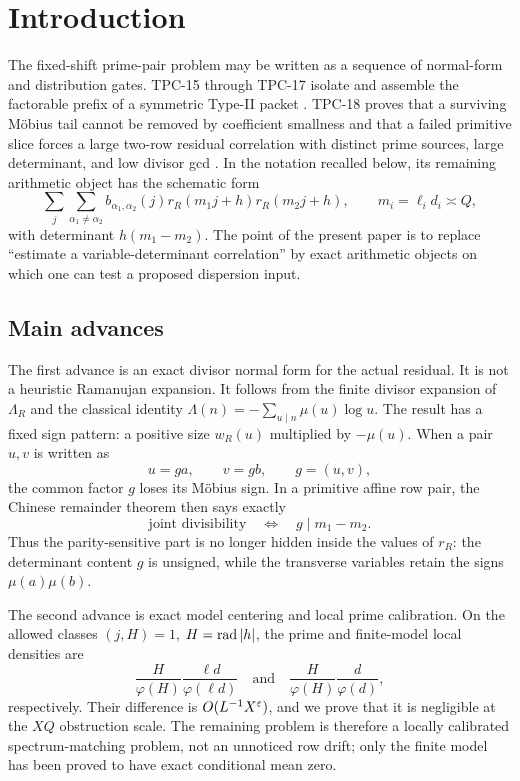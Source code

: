 \section{Introduction}
\label{sec:introduction}

The fixed-shift prime-pair problem may be written as a sequence of
normal-form and distribution gates.  TPC-15 through TPC-17 isolate and
assemble the factorable prefix of a symmetric Type-II packet
\citep{WangTPC15,WangTPC16,WangTPC17}.  TPC-18 proves that a surviving
M\"obius tail cannot be removed by coefficient smallness and that a
failed primitive slice forces a large two-row residual correlation with
distinct prime sources, large determinant, and low divisor gcd
\citep{WangTPC18}.  In the notation recalled below, its remaining
arithmetic object has the schematic form
\begin{equation}
 \sum_j\sum_{\alpha_1\ne\alpha_2}
 b_{\alpha_1,\alpha_2}(j)
 r_R(m_1j+h)r_R(m_2j+h),
 \qquad m_i=\ell_i d_i\asymp Q,
 \label{eq:opaque-correlation}
\end{equation}
with determinant \(h(m_1-m_2)\).  The point of the present paper is to
replace ``estimate a variable-determinant correlation'' by exact
arithmetic objects on which one can test a proposed dispersion input.

\subsection{Main advances}

The first advance is an exact divisor normal form for the actual
residual.  It is not a heuristic Ramanujan expansion.  It follows from
the finite divisor expansion of \(\Lambda_R\) and the classical identity
\(\Lambda(n)=-\sum_{u\mid n}\mu(u)\log u\).  The result has a fixed sign
pattern: a positive size \(w_R(u)\) multiplied by \(-\mu(u)\).  When a
pair \(u,v\) is written as
\[
 u=ga,\qquad v=gb,\qquad g=(u,v),
\]
the common factor \(g\) loses its M\"obius sign.  In a primitive affine
row pair, the Chinese remainder theorem then says exactly
\[
 \text{joint divisibility}\quad\Longleftrightarrow\quad
 g\mid m_1-m_2.
\]
Thus the parity-sensitive part is no longer hidden inside the values of
\(r_R\): the determinant content \(g\) is unsigned, while the transverse
variables retain the signs \(\mu(a)\mu(b)\).

The second advance is exact model centering and local prime
calibration.  On the allowed classes
\((j,H)=1\), \(H=\operatorname{rad}|h|\), the prime and finite-model local densities
are
\[
 \frac{H}{\varphi(H)}\frac{\ell d}{\varphi(\ell d)}
 \quad\text{and}\quad
 \frac{H}{\varphi(H)}\frac d{\varphi(d)},
\]
respectively.  Their difference is \(O(L^{-1}X^\varepsilon)\), and we prove
that it is negligible at the \(XQ\) obstruction scale.  The remaining
problem is therefore a locally calibrated spectrum-matching problem,
not an unnoticed row drift; only the finite model has been proved to
have exact conditional mean zero.

